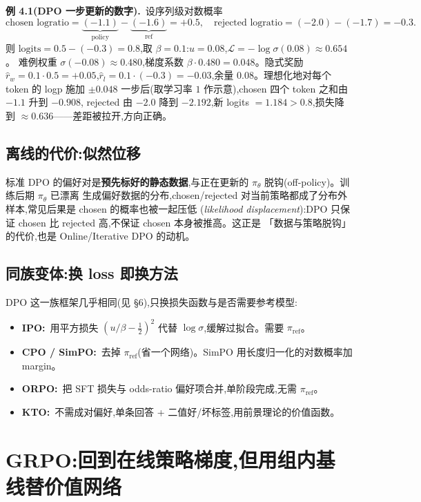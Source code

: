 \documentclass[11pt]{article}
\newcommand{\piref}{\pi_{\mathrm{ref}}}
\newcommand{\pith}{\pi_\theta}
\newcommand{\sig}{\sigma}
\theoremstyle{plain}
\theoremstyle{definition}
\theoremstyle{remark}
\begin{document}
\begin{exbox}
\textbf{例 4.1(DPO 一步更新的数字).}\ 设序列级对数概率
\[
\text{chosen logratio}=\underbrace{(-1.1)}_{\text{policy}}-\underbrace{(-1.6)}_{\text{ref}}=+0.5,\quad
\text{rejected logratio}=(-2.0)-(-1.7)=-0.3.
\]
则 $\text{logits}=0.5-(-0.3)=0.8$,取 $\beta=0.1$:$u=0.08$,$\mathcal{L}=-\log\sig(0.08)\approx0.654$。
难例权重 $\sig(-0.08)\approx0.480$,梯度系数 $\beta\cdot0.480=0.048$。隐式奖励
$\hat r_w=0.1\cdot0.5=+0.05$,$\hat r_l=0.1\cdot(-0.3)=-0.03$,余量 $0.08$。理想化地对每个 token 的 logp
施加 $\pm0.048$ 一步后(取学习率 $1$ 作示意),chosen 四个 token 之和由 $-1.1$ 升到 $-0.908$,
rejected 由 $-2.0$ 降到 $-2.192$,新 logits $=1.184>0.8$,损失降到 $\approx0.636$——差距被拉开,方向正确。
\end{exbox}

\subsection{离线的代价:似然位移}

标准 DPO 的偏好对是\textbf{预先标好的静态数据},与正在更新的 $\pith$ 脱钩(off-policy)。训练后期 $\pith$ 已漂离
生成偏好数据的分布,chosen/rejected 对当前策略都成了分布外样本,常见后果是 chosen 的概率也被一起压低
(\emph{likelihood displacement}):DPO 只保证 chosen 比 rejected 高,不保证 chosen 本身被推高。这正是
「数据与策略脱钩」的代价,也是 Online/Iterative DPO 的动机。

\subsection{同族变体:换 loss 即换方法}

DPO 这一族框架几乎相同(见 \S6),只换损失函数与是否需要参考模型:
\begin{itemize}[topsep=2pt,itemsep=1pt]
\item \textbf{IPO:}\ 用平方损失 $(u/\beta-\tfrac12)^2$ 代替 $\log\sig$,缓解过拟合。需要 $\piref$。
\item \textbf{CPO / SimPO:}\ 去掉 $\piref$(省一个网络)。SimPO 用长度归一化的对数概率加 margin。
\item \textbf{ORPO:}\ 把 SFT 损失与 odds-ratio 偏好项合并,单阶段完成,无需 $\piref$。
\item \textbf{KTO:}\ 不需成对偏好,单条回答 + 二值好/坏标签,用前景理论的价值函数。
\end{itemize}

\section{GRPO:回到在线策略梯度,但用组内基线替价值网络}
\end{document}
